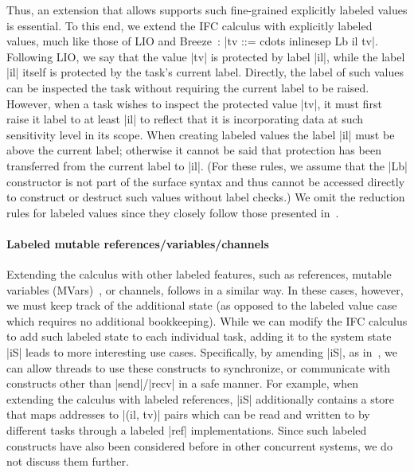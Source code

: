 Thus, an extension that allows supports such fine-grained explicitly
labeled values is essential.
%
To this end, we extend the IFC calculus with explicitly labeled
values, much like those of LIO and
Breeze~\cite{lio, Hritcu:2013:YIB:2497621.2498098}: |tv ::= cdots
inlinesep Lb il tv|.
%
Following LIO, we say that the value |tv| is protected by label |il|,
while the label |il| itself is protected by the task's current label.
%
%
Directly, the label of such values can be inspected the task without
requiring the current label to be raised.
%
However, when a task wishes to inspect the protected value |tv|, it
must first raise it label to at least |il| to reflect that it is
incorporating data at such sensitivity level in its scope.
%
When creating labeled values the label |il| must be above
the current label; otherwise it cannot be said that protection has
been transferred from the current label to |il|.
%
(For these rules, we assume that the |Lb| constructor is not part of
the surface syntax and thus cannot be accessed directly to construct
or destruct such values without label checks.)
% 
We omit the reduction rules for labeled values since they closely
follow those presented in~\cite{lio}.

\paragraph{Labeled mutable references/variables/channels}
%
Extending the calculus with other labeled features, such as
references, mutable variables (MVars)~\cite{CH96}, or channels,
follows in a similar way.
%
In these cases, however, we must keep track of the additional state
(as opposed to the labeled value case which requires no additional
bookkeeping).
%
While we can modify the IFC calculus to add such labeled state to each
individual task, adding it to the system state |iS| leads to more
interesting use cases.
%
Specifically, by amending |iS|, as in~\cite{lio,
stefan;addressing-covert}, we can allow threads to use these
constructs to synchronize, or communicate with constructs other than
|send|/|recv| in a safe manner.
%
For example, when extending the calculus with labeled references, |iS|
additionally contains a store that maps addresses to |(il, tv)| pairs
which can be read and written to by different tasks through a labeled
|ref| implementations.
%
Since such labeled constructs have also been considered before in other
concurrent systems, we do not discuss them further.

